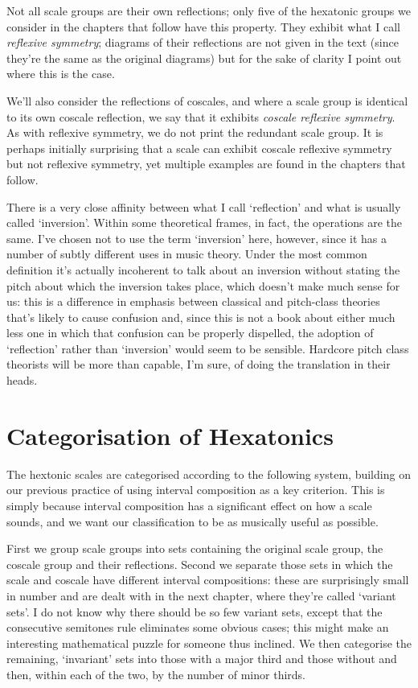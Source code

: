 \documentclass[english]{./gbook}
\begin{document}
\begin{large}
Not all scale groups are their own reflections; only five of the hexatonic groups we consider in the chapters that follow have this property. They exhibit what I call \emph{reflexive symmetry}; diagrams of their reflections are not given in the text (since they're the same as the original diagrams) but for the sake of clarity I point out where this is the case.

We'll also consider the reflections of coscales, and where a scale group is identical to its own coscale reflection, we say that it exhibits \emph{coscale reflexive symmetry}. As with reflexive symmetry, we do not print the redundant scale group. It is perhaps initially surprising that a scale can exhibit coscale reflexive symmetry but not reflexive symmetry, yet multiple examples are found in the chapters that follow.

There is a very close affinity between what I call `reflection' and what is usually called `inversion'. Within some theoretical frames, in fact, the operations are the same. I've chosen not to use the term `inversion' here, however, since it has a number of subtly different uses in music theory. Under the most common definition it's actually incoherent to talk about an inversion without stating the pitch about which the inversion takes place, which doesn't make much sense for us: this is a difference in emphasis between classical and pitch-class theories that's likely to cause confusion and, since this is not a book about either much less one in which that confusion can be properly dispelled, the adoption of `reflection' rather than `inversion' would seem to be sensible. Hardcore pitch class theorists will be more than capable, I'm sure, of doing the translation in their heads.


\section{Categorisation of Hexatonics}

The hextonic scales are categorised according to the following system, building on our previous practice of using interval composition as a key criterion. This is simply because interval composition has a significant effect on how a scale sounds, and we want our classification to be as musically useful as possible.

First we group scale groups into sets containing the original scale group, the coscale group and their reflections. Second we separate those sets in which the scale and coscale have different interval compositions: these are surprisingly small in number and are dealt with in the next chapter, where they're called `variant sets'. I do not know why there should be so few variant sets, except that the consecutive semitones rule eliminates some obvious cases; this might make an interesting mathematical puzzle for someone thus inclined. We then categorise the remaining, `invariant' sets into those with a major third and those without and then, within each of the two, by the number of minor thirds.


\end{large}
\end{document}
